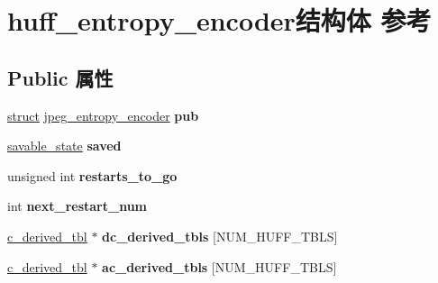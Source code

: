\hypertarget{structhuff__entropy__encoder}{}\section{huff\+\_\+entropy\+\_\+encoder结构体 参考}
\label{structhuff__entropy__encoder}
\subsection*{Public 属性}
\begin{DoxyCompactItemize}
\item 
\mbox{\label{structhuff__entropy__encoder_a1a7606509ffbd9efd4c611af433879e0}} 
\hyperlink{interfacestruct}{struct} \hyperlink{structjpeg__entropy__encoder}{jpeg\+\_\+entropy\+\_\+encoder} {\bfseries pub}
\item 
\mbox{\label{structhuff__entropy__encoder_ac27e136d5c3baca34bafde2053d91ad0}} 
\hyperlink{structsavable__state}{savable\+\_\+state} {\bfseries saved}
\item 
\mbox{\label{structhuff__entropy__encoder_a6c999079a14022f2610081d420c36513}} 
unsigned int {\bfseries restarts\+\_\+to\+\_\+go}
\item 
\mbox{\label{structhuff__entropy__encoder_ad6a426b0d41e9d06359bcc57481c891b}} 
int {\bfseries next\+\_\+restart\+\_\+num}
\item 
\mbox{\label{structhuff__entropy__encoder_a6264cf74944972824cea6639229bdebe}} 
\hyperlink{structc__derived__tbl}{c\+\_\+derived\+\_\+tbl} $\ast$ {\bfseries dc\+\_\+derived\+\_\+tbls} \mbox{[}N\+U\+M\+\_\+\+H\+U\+F\+F\+\_\+\+T\+B\+LS\mbox{]}
\item 
\mbox{\label{structhuff__entropy__encoder_a0b67beb3a73da24b5d09693f3c0c8b22}} 
\hyperlink{structc__derived__tbl}{c\+\_\+derived\+\_\+tbl} $\ast$ {\bfseries ac\+\_\+derived\+\_\+tbls} \mbox{[}N\+U\+M\+\_\+\+H\+U\+F\+F\+\_\+\+T\+B\+LS\mbox{]}
\item 
\mbox{\label{structhuff__entropy__encoder_aee66f11440e615c95b333d71d3613513}} 

\end{DoxyCompactItemize}
